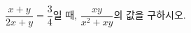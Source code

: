 \hspace*{2mm}\begin{minipage}[t]{\dimexpr\linewidth-2mm\relax}\vspace{0pt}
$\dfrac{x+y}{2x+y}=\dfrac{3}{4}$일 때, $\dfrac{xy}{x^2+xy}$의 값을 구하시오.\end{minipage}
